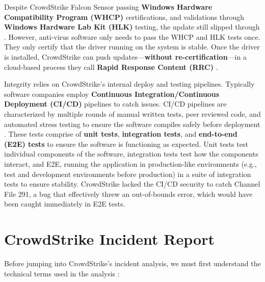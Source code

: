 Despite CrowdStrike Falcon Sensor passing \textbf{Windows Hardware Compatibility Program (WHCP)} certifications, and
validations through \textbf{Windows Hardware Lab Kit (HLK)} testing, the update still slipped through \cite{microsoftwhcpcertification}.
However, anti-virus software only needs to pass the WHCP and HLK tests once. They only certify that the driver running on the system
is stable. Once the driver is installed, CrowdStrike can push updates---\textbf{without re-certification}---in a cloud-based process they call
\textbf{Rapid Response Content (RRC)} \cite{crowdstrikechannelfile291rca}.

Integrity relies on CrowdStrike's internal deploy and testing pipelines. Typically software companies employ \textbf{Continuous Integration/Continuous Deployment (CI/CD)} pipelines
to catch issues. CI/CD pipelines are characterized by multiple rounds of manual written tests, peer reviewed code, and automated stress testing to ensure the software compiles safely before deployment \cite{redhat_cicd_2023}.
These tests comprise of \textbf{unit tests}, \textbf{integration tests}, and \textbf{end-to-end (E2E) tests} to ensure the software is functioning as expected.
Unit tests test individual components of the software, integration tests test how the components interact, and E2E, running the application in production-like environments (e.g., test and development environments before production) in
a suite of integration tests to ensure stability. CrowdStrike lacked the CI/CD security to catch Channel File 291, a bug that effectively threw an out-of-bounds error, which would have been caught 
immediately in E2E tests.

\section{CrowdStrike Incident Report}

Before jumping into CrowdStrike's incident analysis, we must first understand the technical terms used in the analysis \cite{crowdstrikechannelfile291rca}:

